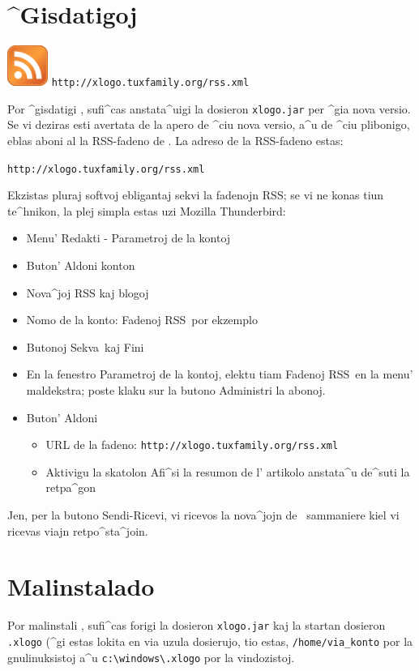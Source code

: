 \section{^Gisdatigoj}
\begin{center}
\includegraphics{bildoj/rss.png} \hspace{1cm} \texttt{http://xlogo.tuxfamily.org/rss.xml}
\end{center}
Por ^gisdatigi \xlogo, sufi^cas anstata^uigi la dosieron
\texttt{xlogo.jar} per ^gia nova versio.  Se vi deziras esti avertata
de la apero de ^ciu nova versio, a^u de ^ciu plibonigo, eblas aboni al
la RSS-fadeno de \xlogo.  La adreso de la RSS-fadeno estas:
\begin{center}
 \texttt{http://xlogo.tuxfamily.org/rss.xml}
\end{center}
Ekzistas pluraj softvoj ebligantaj sekvi la fadenojn RSS; se vi ne
konas tiun te^hnikon, la plej simpla estas uzi Mozilla Thunderbird:
\begin{itemize}
 \item Menu' Redakti - Parametroj de la kontoj
 \item Buton' \og Aldoni konton\fg
 \item \og Nova^joj RSS kaj blogoj\fg
 \item Nomo de la konto: \og Fadenoj RSS\fg\ por ekzemplo
 \item Butonoj \og Sekva\fg\ kaj \og Fini\fg
 \item En la fenestro \og Parametroj de la kontoj\fg, elektu tiam \og
   Fadenoj RSS\fg\ en la menu' maldekstra; poste klaku sur la butono
   \og Administri la abonoj\fg.
 \item Buton' \og Aldoni\fg
	\begin{itemize}
 	\item URL de la fadeno: \texttt{http://xlogo.tuxfamily.org/rss.xml}
	\item Aktivigu la skatolon \og Afi^si la resumon de l'
          artikolo anstata^u de^suti la retpa^gon\fg
	\end{itemize}
\end{itemize}
\vspace*{0.2cm} Jen, per la butono \og Sendi-Ricevi\fg, vi ricevos la
nova^jojn de \xlogo\ sammaniere kiel vi ricevas viajn retpo^sta^join.
\section{Malinstalado}\label{fichier_perso}
Por malinstali \xlogo, sufi^cas forigi la dosieron \texttt{xlogo.jar}
kaj la startan dosieron \texttt{.xlogo} (^gi estas lokita en via uzula
dosierujo, tio estas, \texttt{/home/via\_konto} por la gnulinuksistoj
a^u \texttt{c:\textbackslash windows\textbackslash.xlogo} por la
vindozistoj.
